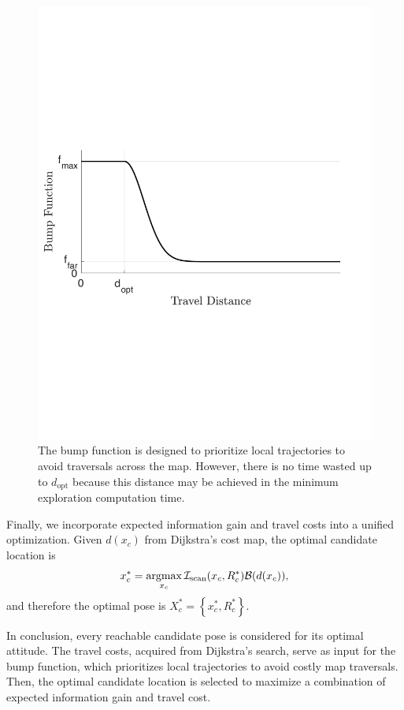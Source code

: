 \documentclass[conf]{new-aiaa}
\newcommand{\braces}[1]{\ensuremath{\left\{ #1 \right\}}}
\newcommand{\argmax}{\operatornamewithlimits{argmax}}
\begin{document}
	\begin{figure}
	\vspace*{-0.3\columnwidth}
		\centerline{
			\includegraphics[width=0.6\columnwidth]{recedingHorizonBumpFunFlattened.pdf}
		}
	\vspace*{-0.25\columnwidth}
		\caption{The bump function is designed to prioritize local trajectories to avoid traversals across the map. However, there is no time wasted up to $d_\text{opt}$ because this distance may be achieved in the minimum exploration computation time.}
		\label{fig:recedingHorizonBumpFun}
	\end{figure}

Finally, we incorporate expected information gain and travel costs into a unified optimization. Given $d(x_c)$ from Dijkstra's cost map, the optimal candidate location is
\begin{align}
x_c^*=\argmax_{x_c}\mathcal{I}_\text{scan}(x_c,R_c^*)\mathcal B(d(x_c)),
\end{align}
and therefore the optimal pose is $X_c^*=\braces{x_c^*,R_c^*}$.

In conclusion, every reachable candidate pose is considered for its optimal attitude. The travel costs, acquired from Dijkstra's search, serve as input for the bump function, which prioritizes local trajectories to avoid costly map traversals. Then, the optimal candidate location is selected to maximize a combination of expected information gain and travel cost.


\end{document}
